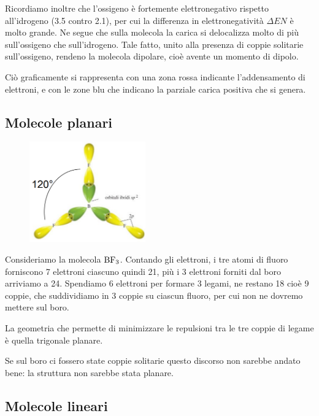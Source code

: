 Ricordiamo inoltre che l'ossigeno è fortemente elettronegativo rispetto all'idrogeno (3.5 contro 2.1), per cui la differenza in elettronegatività $\Delta EN$ è molto grande. Ne segue che sulla molecola la carica si delocalizza molto di più sull'ossigeno che sull'idrogeno. Tale fatto, unito alla presenza di coppie solitarie sull'ossigeno, rendeno la molecola dipolare, cioè avente un momento di dipolo.

Ciò graficamente si rappresenta con una zona rossa indicante l'addensamento di elettroni, e con le zone blu che indicano la parziale carica positiva che si genera.

\subsection{Molecole planari}
\vspace{-0.4cm}
\begin{minipage}{0.4\textwidth}
    \begin{figure}[H]
        \includegraphics[width=5cm]{immagini/BF_3.png} 
    \end{figure}
\end{minipage}
\hfill
\begin{minipage}{0.6\textwidth}
\vspace{0.6cm}Consideriamo la molecola $\rm BF_3$. Contando gli elettroni, i tre atomi di fluoro forniscono 7 elettroni ciascuno quindi 21, più i 3 elettroni forniti dal boro arriviamo a 24. Spendiamo 6 elettroni  per formare 3 legami, ne restano 18 cioè 9 coppie, che suddividiamo in 3 coppie su ciascun fluoro, per cui non ne dovremo mettere sul boro.

La geometria che permette di minimizzare le repulsioni tra le tre coppie di legame è quella trigonale planare.

Se sul boro ci fossero state coppie solitarie questo discorso non sarebbe andato bene: la struttura non sarebbe stata planare.
\end{minipage}

\subsection{Molecole lineari}

